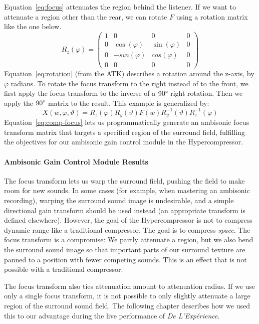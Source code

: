 Equation~\ref{eq:focus} attenuates the region behind the listener. 
If we want to attenuate a region other than the rear, we can rotate
$F$ using a rotation matrix like the one below.
\begin{equation}
R_z(\varphi)=\left( \begin{array}{cccc}
1 & 0 & 0 & 0 \\
0 & \cos(\varphi) & \sin(\varphi) & 0 \\
0 & -sin(\varphi) & cos(\varphi) & 0 \\
0 & 0 & 0 & 0
\end{array} \right)
\label{eq:rotation}
\end{equation}
Equation~\ref{eq:rotation} (from the ATK) describes a rotation around
the z-axis, by $\varphi$ radians. To rotate the focus transform to the
right instead of to the front, we first apply the focus transform to
the inverse of a $90\degree$ right rotation. Then we apply the
$90\degree$ matrix to the result. This example is generalized by:
\begin{equation}
X(w,\varphi,\vartheta)=R_z(\varphi)R_y(\vartheta)F(w) R_y^{-1}(\vartheta)R_z^{-1}(\varphi)
\label{eq:comp-focus}
\end{equation}
Equation~\ref{eq:comp-focus} lets us programmatically generate an
ambisonic focus transform matrix that targets a specified region of
the surround field, fulfilling the objectives for our ambisonic gain
control module in the Hypercompressor.

\paragraph{Ambisonic Gain Control Module Results}
The focus transform lets us warp the surround field, pushing the
field to make room for new sounds. In some cases (for example, when
mastering an ambisonic recording), warping the surround sound image is
undesirable, and a simple directional gain transform should be used
instead (an appropriate transform is defined
elsewhere\cite{Kronlachner2014i}). However, the goal of the
Hypercompressor is not to compress dynamic range like a traditional
compressor. The goal is to compress \emph{space}. The focus transform
is a compromise: We partly attenuate a region, but we also bend the
surround sound image so that important parts of our surround texture are
panned to a position with fewer competing sounds. This is an effect
that is not possible with a traditional compressor.

The focus transform also ties attenuation amount to attenuation
radius. If we use only a single focus transform, it is not possible to only
slightly attenuate a large region of the surround sound field. The
following chapter describes how we used this to our advantage
during the live performance of \textit{De L'Exp\'{e}rience}.

